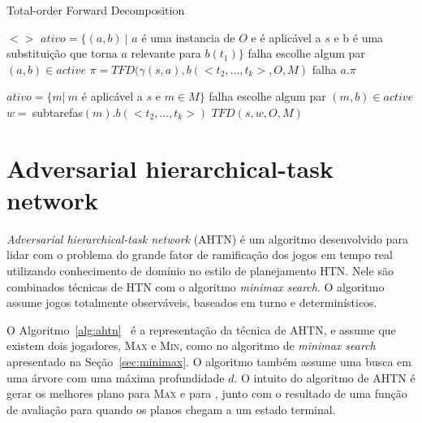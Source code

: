 \begin{algorithm}
	\caption{Total-order Forward Decomposition}
	\label{alg:tfd}
	\begin{algorithmic}[1]		
				\State	\Return $<>$
			\EndIf
				\State $ativo = \{(a, b)~ |$ $a$ é uma instancia de $O$ e é aplicável a $s$ e b é uma substituição que torna $a$ relevante para $b(t_{1})\}$
					\State \Return falha
				\EndIf
				\State escolhe algum par $(a, b) \in active$
				\State $\pi = TFD(\gamma(s, a), b(<t_{2}, ..., t_{k}>, O, M)$
					\State \Return falha
				\Else 
					\State \Return $a . \pi$
			\EndIf
			
				\State $ativo = \{m |~ m$ é aplicável a $s$ e $m \in M\}$
					\State \Return falha
				\EndIf
				\State escolhe algum par $(m, b) \in active$
				\State $w =~ $subtarefas$(m).b(<t_{2}, ..., t_{k}>)$
				\State \Return $TFD(s, w, O, M)$
				\EndIf
		\EndFunction
	\end{algorithmic}
\end{algorithm}

\section{Adversarial hierarchical-task network} \label{sec:ahtn}

\textit{Adversarial hierarchical-task network} (AHTN) é um algoritmo desenvolvido para lidar com o problema do grande fator de ramificação dos jogos em tempo real~\cite{ontanon2015adversarial} utilizando conhecimento de domínio no estilo de planejamento HTN. 
Nele são combinados técnicas de HTN com o algoritmo \textit{minimax search}. 
O algoritmo assume jogos totalmente observáveis, baseados em turno e determinísticos. 

O Algoritmo~\ref{alg:ahtn}~\cite{ontanon2015adversarial} é a representação da técnica de AHTN, e assume que existem dois jogadores, \textsc{Max} e \textsc{Min}, como no algoritmo de \textit{minimax search} apresentado na Seção~\ref{sec:minimax}. 
O algoritmo também assume uma busca em uma árvore com uma máxima profundidade $d$. 
O intuito do algoritmo de AHTN é gerar os melhores plano para \textsc{Max} e para , junto com o resultado de uma função de avaliação para quando os planos chegam a um estado terminal. 

